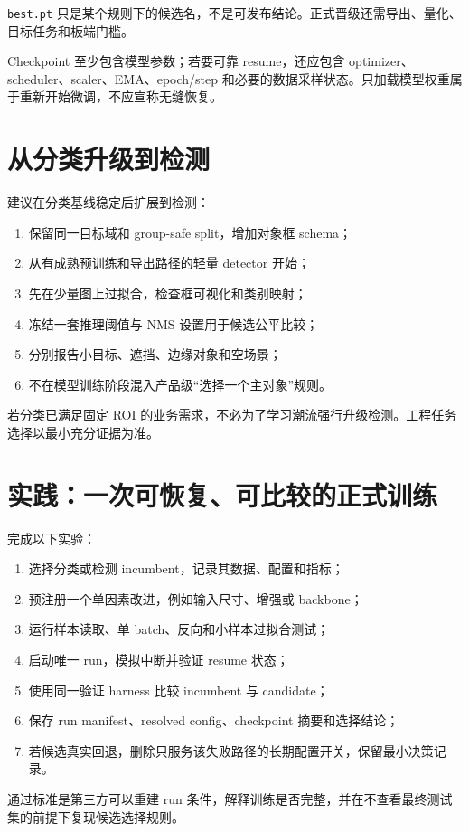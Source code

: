 \texttt{best.pt} 只是某个规则下的候选名，不是可发布结论。正式晋级还需导出、量化、目标任务和板端门槛。

Checkpoint 至少包含模型参数；若要可靠 resume，还应包含 optimizer、scheduler、scaler、EMA、epoch/step 和必要的数据采样状态。只加载模型权重属于重新开始微调，不应宣称无缝恢复。

\section{从分类升级到检测}

建议在分类基线稳定后扩展到检测：

\begin{enumerate}
  \item 保留同一目标域和 group-safe split，增加对象框 schema；
  \item 从有成熟预训练和导出路径的轻量 detector 开始；
  \item 先在少量图上过拟合，检查框可视化和类别映射；
  \item 冻结一套推理阈值与 NMS 设置用于候选公平比较；
  \item 分别报告小目标、遮挡、边缘对象和空场景；
  \item 不在模型训练阶段混入产品级“选择一个主对象”规则。
\end{enumerate}

若分类已满足固定 ROI 的业务需求，不必为了学习潮流强行升级检测。工程任务选择以最小充分证据为准。

\section{实践：一次可恢复、可比较的正式训练}

完成以下实验：

\begin{enumerate}
  \item 选择分类或检测 incumbent，记录其数据、配置和指标；
  \item 预注册一个单因素改进，例如输入尺寸、增强或 backbone；
  \item 运行样本读取、单 batch、反向和小样本过拟合测试；
  \item 启动唯一 run，模拟中断并验证 resume 状态；
  \item 使用同一验证 harness 比较 incumbent 与 candidate；
  \item 保存 run manifest、resolved config、checkpoint 摘要和选择结论；
  \item 若候选真实回退，删除只服务该失败路径的长期配置开关，保留最小决策记录。
\end{enumerate}

通过标准是第三方可以重建 run 条件，解释训练是否完整，并在不查看最终测试集的前提下复现候选选择规则。
